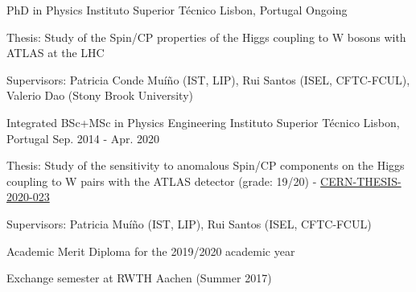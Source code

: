 
\begin{cventries}

\cventry
  {PhD in Physics}
  {Instituto Superior Técnico}
  {Lisbon, Portugal}
  {Ongoing}
  {
    \begin{cvitems}
      \item {Thesis: Study of the Spin/CP properties of the Higgs coupling to W bosons with ATLAS at the LHC}
      \item {Supervisors: Patricia Conde Muíño (IST, LIP), Rui Santos (ISEL, CFTC-FCUL), Valerio Dao (Stony Brook University)}
    \end{cvitems}
  }

  \cventry
    {Integrated BSc+MSc in Physics Engineering} %
    {Instituto Superior Técnico} %
    {Lisbon, Portugal} %
    {Sep. 2014 - Apr. 2020} %
    {
      \begin{cvitems} %
        \item {Thesis: Study of the sensitivity to anomalous Spin/CP components on the Higgs coupling to W pairs with the ATLAS detector (grade: 19/20) - \href{https://cds.cern.ch/record/2715646}{CERN-THESIS-2020-023}}
        \item {Supervisors: Patricia Muíño (IST, LIP), Rui Santos (ISEL, CFTC-FCUL)}
        \item {Academic Merit Diploma for the 2019/2020 academic year}
        \item {Exchange semester at RWTH Aachen (Summer 2017)}
      \end{cvitems}
    }



\end{cventries}